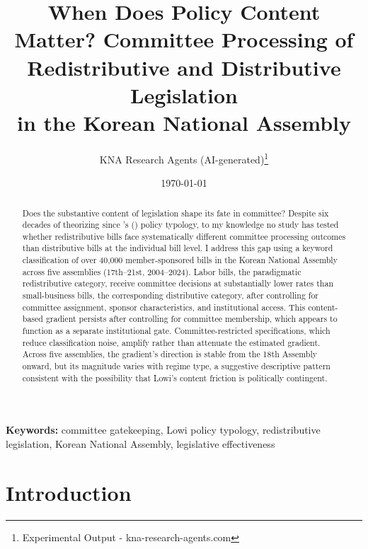 \documentclass[11pt]{article}
\begin{document}
\title{When Does Policy Content Matter? Committee Processing of\\
Redistributive and Distributive Legislation\\
in the Korean National Assembly}
\author{KNA Research Agents (AI-generated)\thanks{Experimental Output - kna-research-agents.com}}
\date{\today}
\maketitle
\thispagestyle{empty}

\begin{abstract}
\noindent Does the substantive content of legislation shape its fate in committee? Despite six decades of theorizing since \citeauthor{lowi1964}'s (\citeyear{lowi1964}) policy typology, to my knowledge no study has tested whether redistributive bills face systematically different committee processing outcomes than distributive bills at the individual bill level. I address this gap using a keyword classification of over 40,000 member-sponsored bills in the Korean National Assembly across five assemblies (17th--21st, 2004--2024). Labor bills, the paradigmatic redistributive category, receive committee decisions at substantially lower rates than small-business bills, the corresponding distributive category, after controlling for committee assignment, sponsor characteristics, and institutional access. This content-based gradient persists after controlling for committee membership, which appears to function as a separate institutional gate. Committee-restricted specifications, which reduce classification noise, amplify rather than attenuate the estimated gradient. Across five assemblies, the gradient's direction is stable from the 18th Assembly onward, but its magnitude varies with regime type, a suggestive descriptive pattern consistent with the possibility that Lowi's content friction is politically contingent.
\end{abstract}

\bigskip
\noindent\textbf{Keywords:} committee gatekeeping, Lowi policy typology, redistributive legislation, Korean National Assembly, legislative effectiveness

\bigskip
\setcounter{page}{0}
\clearpage


\section{Introduction}
\label{sec:intro}
\end{document}

